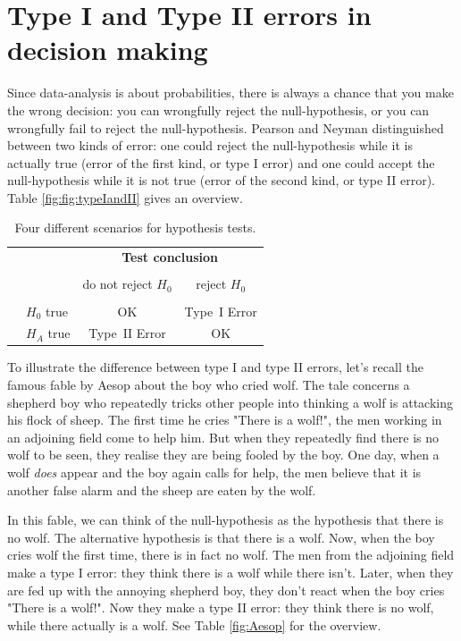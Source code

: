 \documentclass[]{report}\usepackage[]{graphicx}\usepackage[]{color}
\begin{document}
\section{Type I and Type II errors in decision making}


Since data-analysis is about probabilities, there is always a chance that you make the wrong decision: you can wrongfully reject the null-hypothesis, or you can wrongfully fail to reject the null-hypothesis. Pearson and Neyman distinguished between two kinds of error: one could reject the null-hypothesis while it is actually true (error of the first kind, or type I error) and one could accept the null-hypothesis while it is not true (error of the second kind, or type II error). Table \ref{fig:fig:typeIandII} gives an overview.


\begin{table}[ht]
\centering
\begin{tabular}{l l c c}
& & \multicolumn{2}{c}{\textbf{Test conclusion}} \\
  \cline{3-4}
\vspace{-3.7mm} \\
& & do not reject $H_0$ &  reject $H_0$\\
  \cline{2-4}
\vspace{-3.7mm} \\
& $H_0$ true & OK &  Type~I Error \\
\raisebox{1.5ex}{\textbf{Truth}} & $H_A$ true & Type~II Error & OK \\
  \cline{2-4}
\end{tabular}
\caption{Four different scenarios for hypothesis tests.}
\label{fig:typeIandII}
\end{table}

To illustrate the difference between type I and type II errors, let's recall the famous fable by Aesop about the boy who cried wolf. The tale concerns a shepherd boy who repeatedly tricks other people into thinking a wolf is attacking his flock of sheep. The first time he cries "There is a wolf!", the men working in an adjoining field come to help him. But when they repeatedly find there is no wolf to be seen, they realise they are being fooled by the boy. One day, when a wolf \textit{does} appear and the boy again calls for help, the men believe that it is another false alarm and the sheep are eaten by the wolf.

In this fable, we can think of the null-hypothesis as the hypothesis that there is no wolf. The alternative hypothesis is that there is a wolf. Now, when the boy cries wolf the first time, there is in fact no wolf. The men from the adjoining field make a type I error: they think there is a wolf while there isn't. Later, when they are fed up with the annoying shepherd boy, they don't react when the boy cries "There is a wolf!". Now they make a type II error: they think there is no wolf, while there actually is a wolf. See Table \ref{fig:Aesop} for the overview.
\end{document}
